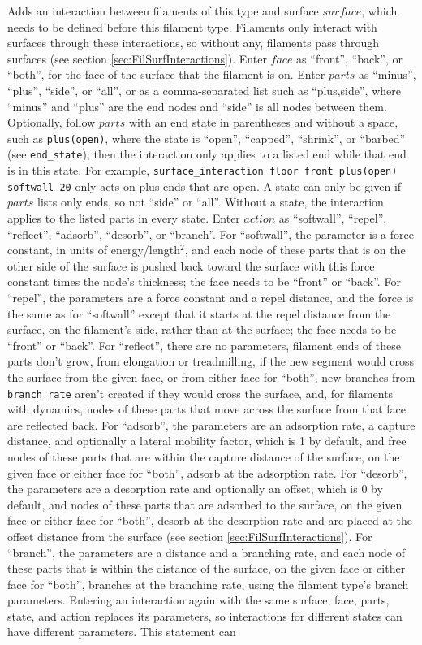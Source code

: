 \documentclass {scrbook}
\newcommand {\ttt} {\texttt}
\begin{document}
\begin{description}
Adds an interaction between filaments of this type and surface $surface$, which needs to be defined before this filament type. Filaments only interact with surfaces through these interactions, so without any, filaments pass through surfaces (see section \ref{sec:FilSurfInteractions}). Enter $face$ as ``front'', ``back'', or ``both'', for the face of the surface that the filament is on. Enter $parts$ as ``minus'', ``plus'', ``side'', or ``all'', or as a comma-separated list such as ``plus,side'', where ``minus'' and ``plus'' are the end nodes and ``side'' is all nodes between them. Optionally, follow $parts$ with an end state in parentheses and without a space, such as \ttt{plus(open)}, where the state is ``open'', ``capped'', ``shrink'', or ``barbed'' (see \ttt{end\_state}); then the interaction only applies to a listed end while that end is in this state. For example, \ttt{surface\_interaction floor front plus(open) softwall 20} only acts on plus ends that are open. A state can only be given if $parts$ lists only ends, so not ``side'' or ``all''. Without a state, the interaction applies to the listed parts in every state. Enter $action$ as ``softwall'', ``repel'', ``reflect'', ``adsorb'', ``desorb'', or ``branch''. For ``softwall'', the parameter is a force constant, in units of energy/length$^2$, and each node of these parts that is on the other side of the surface is pushed back toward the surface with this force constant times the node's thickness; the face needs to be ``front'' or ``back''. For ``repel'', the parameters are a force constant and a repel distance, and the force is the same as for ``softwall'' except that it starts at the repel distance from the surface, on the filament's side, rather than at the surface; the face needs to be ``front'' or ``back''. For ``reflect'', there are no parameters, filament ends of these parts don't grow, from elongation or treadmilling, if the new segment would cross the surface from the given face, or from either face for ``both'', new branches from \ttt{branch\_rate} aren't created if they would cross the surface, and, for filaments with dynamics, nodes of these parts that move across the surface from that face are reflected back. For ``adsorb'', the parameters are an adsorption rate, a capture distance, and optionally a lateral mobility factor, which is 1 by default, and free nodes of these parts that are within the capture distance of the surface, on the given face or either face for ``both'', adsorb at the adsorption rate. For ``desorb'', the parameters are a desorption rate and optionally an offset, which is 0 by default, and nodes of these parts that are adsorbed to the surface, on the given face or either face for ``both'', desorb at the desorption rate and are placed at the offset distance from the surface (see section \ref{sec:FilSurfInteractions}). For ``branch'', the parameters are a distance and a branching rate, and each node of these parts that is within the distance of the surface, on the given face or either face for ``both'', branches at the branching rate, using the filament type's branch parameters. Entering an interaction again with the same surface, face, parts, state, and action replaces its parameters, so interactions for different states can have different parameters. This statement can 
\end{description}
\end{document}
